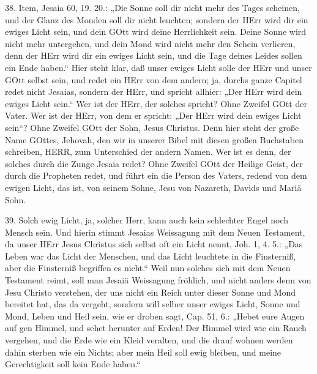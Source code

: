 38. Item, Jesaia 60, 19. 20.: „Die Sonne soll dir nicht mehr des Tages scheinen, und der Glanz des Monden soll dir nicht leuchten; sondern der HErr wird dir ein ewiges Licht sein, und dein GOtt wird deine Herrlichkeit sein. Deine Sonne wird nicht mehr untergehen, und dein Mond wird nicht mehr den Schein verlieren, denn der HErr wird dir ein ewiges Licht sein, und die Tage deines Leides sollen ein Ende haben.“ Hier steht klar, daß unser ewiges Licht solle der HErr und unser GOtt selbst sein, und redet ein HErr von dem andern; ja, durchs ganze Capitel redet nicht Jesaias, sondern der HErr, und spricht allhier: „Der HErr wird dein ewiges Licht sein.“ Wer ist der HErr, der solches spricht? Ohne Zweifel GOtt der Vater. Wer ist der HErr, von dem er spricht: „Der HErr wird dein ewiges Licht sein“? Ohne Zweifel GOtt der Sohn, Jesus Christus. Denn hier steht der große Name GOttes, Jehovah, den wir in unserer Bibel mit diesen großen Buchstaben schreiben, HERR, zum Unterschied der andern Namen. Wer ist es denn, der solches durch die Zunge Jesaia redet? Ohne Zweifel GOtt der Heilige Geist, der durch die Propheten redet, und führt ein die Person des Vaters, redend von dem ewigen Licht, das ist, von seinem Sohne, Jesu von Nazareth, Davids und Mariä Sohn.

39. Solch ewig Licht, ja, solcher Herr, kann
auch kein schlechter Engel noch Mensch sein. Und hierin stimmt Jesaias Weissagung mit dem Neuen Testament, da unser HErr Jesus Christus sich selbst oft ein Licht nennt, Joh. 1, 4. 5.: „Das Leben war das Licht der Menschen, und das Licht leuchtete in die Finsterniß, aber die Finsterniß begriffen es nicht.“ Weil nun solches sich mit dem Neuen Testament reimt, soll man Jesaiä Weissagung fröhlich, und nicht anders denn von Jesu Christo verstehen, der uns nicht ein Reich unter dieser Sonne und Mond bereitet hat, das da vergeht, sondern will selber unser ewiges Licht, Sonne und Mond, Leben und Heil sein, wie er droben sagt, Cap. 51, 6.: „Hebet eure Augen auf gen Himmel, und sehet herunter auf Erden! Der Himmel wird wie ein Rauch vergehen, und die Erde wie ein Kleid veralten, und die drauf wohnen werden dahin sterben wie ein Nichts; aber mein Heil soll ewig bleiben, und meine Gerechtigkeit soll kein Ende haben.“

